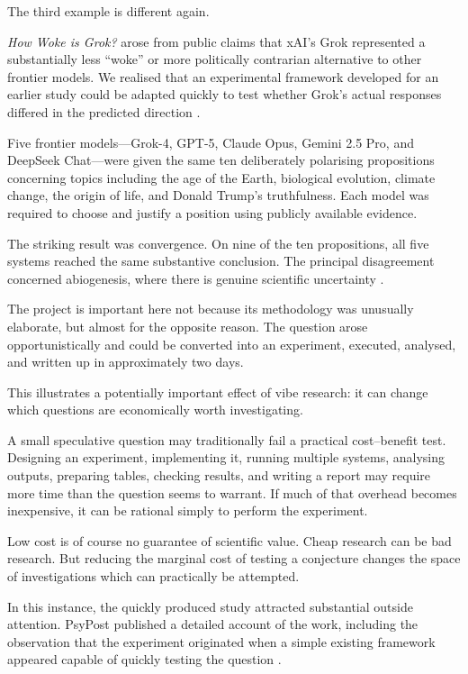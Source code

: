 \documentclass[12pt]{article}
\begin{document}
The third example is different again.

\emph{How Woke is Grok?} arose from public claims that xAI's Grok represented a substantially less ``woke'' or more politically contrarian alternative to other frontier models. We realised that an experimental framework developed for an earlier study could be adapted quickly to test whether Grok's actual responses differed in the predicted direction \citep[Sections~1--3]{raynerChatGPT2025grok}.

Five frontier models---Grok-4, GPT-5, Claude Opus, Gemini 2.5 Pro, and DeepSeek Chat---were given the same ten deliberately polarising propositions concerning topics including the age of the Earth, biological evolution, climate change, the origin of life, and Donald Trump's truthfulness. Each model was required to choose and justify a position using publicly available evidence.

The striking result was convergence. On nine of the ten propositions, all five systems reached the same substantive conclusion. The principal disagreement concerned abiogenesis, where there is genuine scientific uncertainty \citep[Section~4]{raynerChatGPT2025grok}.

The project is important here not because its methodology was unusually elaborate, but almost for the opposite reason. The question arose opportunistically and could be converted into an experiment, executed, analysed, and written up in approximately two days.

This illustrates a potentially important effect of vibe research: it can change which questions are economically worth investigating.

A small speculative question may traditionally fail a practical cost--benefit test. Designing an experiment, implementing it, running multiple systems, analysing outputs, preparing tables, checking results, and writing a report may require more time than the question seems to warrant. If much of that overhead becomes inexpensive, it can be rational simply to perform the experiment.

Low cost is of course no guarantee of scientific value. Cheap research can be bad research. But reducing the marginal cost of testing a conjecture changes the space of investigations which can practically be attempted.

In this instance, the quickly produced study attracted substantial outside attention. PsyPost published a detailed account of the work, including the observation that the experiment originated when a simple existing framework appeared capable of quickly testing the question \citep{dolan2025grok}.
\end{document}
